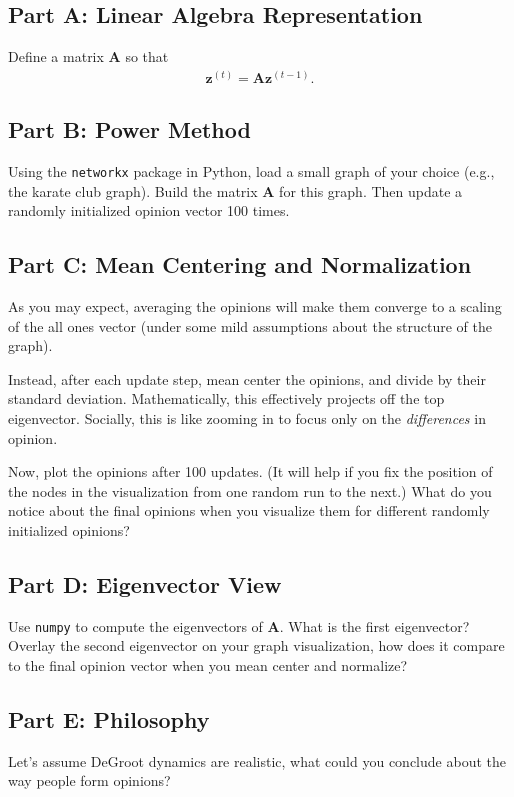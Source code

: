 \documentclass{article}
\begin{document}
\subsection*{Part A: Linear Algebra Representation}

Define a matrix $\mathbf{A}$ so that 
\begin{align*}
    \mathbf{z}^{(t)} = \mathbf{A} \mathbf{z}^{(t-1)}.
\end{align*}

\subsection*{Part B: Power Method}

Using the \texttt{networkx} package in Python, load a small graph of your choice (e.g., the karate club graph). Build the matrix $\mathbf{A}$ for this graph. Then update a randomly initialized opinion vector 100 times.

\subsection*{Part C: Mean Centering and Normalization}

As you may expect, averaging the opinions will make them converge to a scaling of the all ones vector (under some mild assumptions about the structure of the graph).

Instead, after each update step, mean center the opinions, and divide by their standard deviation.
Mathematically, this effectively projects off the top eigenvector.
Socially, this is like zooming in to focus only on the \textit{differences} in opinion.

Now, plot the opinions after 100 updates.
(It will help if you fix the position of the nodes in the visualization from one random run to the next.)
What do you notice about the final opinions when you visualize them for different randomly initialized opinions?

\subsection*{Part D: Eigenvector View}

Use \texttt{numpy} to compute the eigenvectors of $\mathbf{A}$.
What is the first eigenvector?
Overlay the second eigenvector on your graph visualization, how does it compare to the final opinion vector when you mean center and normalize?

\subsection*{Part E: Philosophy}

Let's assume DeGroot dynamics are realistic, what could you conclude about the way people form opinions?

%
\end{document}
